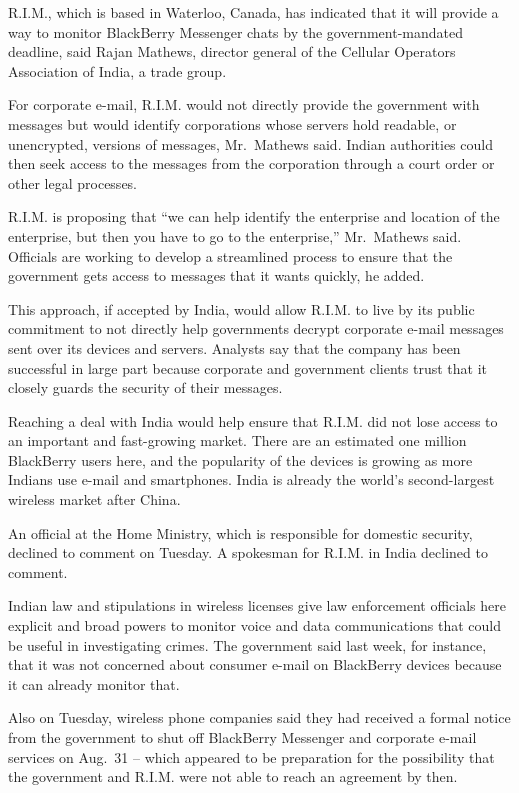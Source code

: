 ﻿\documentclass[12pt]{article}
\begin{document}
R.I.M., which is based in Waterloo, Canada, has indicated that it will provide a way to monitor
BlackBerry Messenger chats by the government-mandated deadline, said Rajan Mathews, director general
of the Cellular Operators Association of India, a trade group.

For corporate e-mail, R.I.M. would not directly provide the government with messages but would
identify corporations whose servers hold readable, or unencrypted, versions of messages, Mr.~Mathews
said. Indian authorities could then seek access to the messages from the corporation through a court
order or other legal processes.

R.I.M. is proposing that ``we can help identify the enterprise and location of the enterprise, but
then you have to go to the enterprise,'' Mr.~Mathews said. Officials are working to develop a
streamlined process to ensure that the government gets access to messages that it wants quickly, he
added.

This approach, if accepted by India, would allow R.I.M. to live by its public commitment to not
directly help governments decrypt corporate e-mail messages sent over its devices and servers.
Analysts say that the company has been successful in large part because corporate and government
clients trust that it closely guards the security of their messages.

Reaching a deal with India would help ensure that R.I.M. did not lose access to an important and
fast-growing market. There are an estimated one million BlackBerry users here, and the popularity of
the devices is growing as more Indians use e-mail and smartphones. India is already the world's
second-largest wireless market after China.

An official at the Home Ministry, which is responsible for domestic security, declined to comment on
Tuesday. A spokesman for R.I.M. in India declined to comment.

Indian law and stipulations in wireless licenses give law enforcement officials here explicit and
broad powers to monitor voice and data communications that could be useful in investigating crimes.
The government said last week, for instance, that it was not concerned about consumer e-mail on
BlackBerry devices because it can already monitor that.

Also on Tuesday, wireless phone companies said they had received a formal notice from the government
to shut off BlackBerry Messenger and corporate e-mail services on Aug.~31 -- which appeared to be
preparation for the possibility that the government and R.I.M. were not able to reach an agreement
by then.
\end{document}
